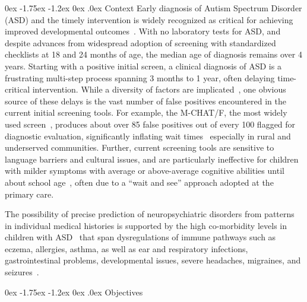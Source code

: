 \documentclass[onecolumn, compsoc,11pt]{IEEEtran}
\makeatletter
\renewcommand\subsection{\@startsection {subsection}{2}{\z@}%
                                   {0ex \@plus -1.75ex \@minus -1.2ex}%
                                   {0ex \@plus.0ex}%
                                   {\fontsize{11}{11}\selectfont\bfseries\sffamily\color{black}}}
\makeatother
\begin{document}
\subsection{Context}
Early diagnosis of Autism Spectrum Disorder (ASD) and the timely  intervention is widely recognized as critical for achieving improved developmental outcomes~\cite{hyman2020identification}. With no laboratory tests for ASD, and despite advances from widespread adoption of screening with standardized checklists at 18 and 24 months of age, the median age of diagnosis remains over 4 years.  Starting with a positive initial screen, a clinical diagnosis of ASD is  a  frustrating multi-step process spanning 3 months to 1 year, often delaying  time-critical intervention. While a diversity of factors are implicated~\cite{kalb2012determinants,bisgaier2011access,fenikile2015barriers,pmid27565363}, one obvious source of these delays  is the vast number of false positives encountered in the current initial  screening tools. For example, the  M-CHAT/F, the most widely used  screen~\cite{robins2014validation,hyman2020identification},  produces about   over 85 false positives out of every 100   flagged for  diagnostic evaluation, significantly inflating wait times~\cite{pmid27565363} especially in rural and underserved communities.
Further, current  screening tools are sensitive to language barriers and cultural issues, and are  particularly ineffective for children with milder symptoms  with average or above-average cognitive abilities until about school age~\cite{jashar2016cognitive,hyman2020identification}, often due to a ``wait and see'' approach adopted at the primary care.

The possibility of   precise prediction  of neuropsychiatric  disorders  from  patterns in individual medical histories is supported by the high co-morbidity levels in children with ASD~\cite{cdc} that span dysregulations of immune pathways such as eczema, allergies, asthma, as well as ear and respiratory infections, gastrointestinal problems, developmental issues, severe headaches, migraines, and seizures~\cite{pmid30733689,pmid22511918}.

\subsection{Objectives}\label{secobj}
\end{document}
